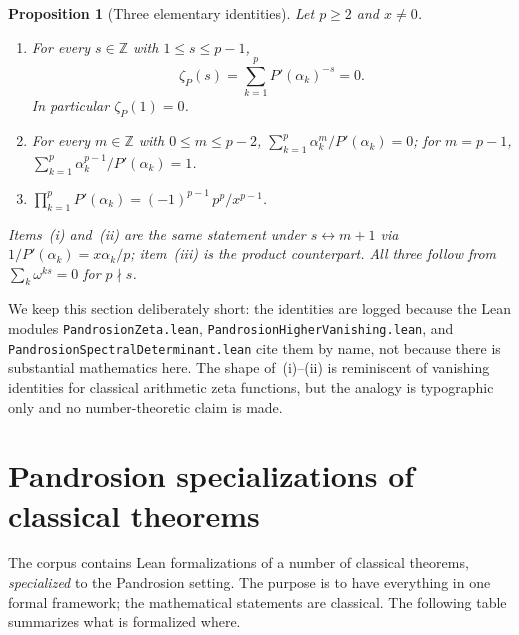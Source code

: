\documentclass[11pt,a4paper]{article}
\newtheorem{proposition}[theorem]{Proposition}
\theoremstyle{definition}
\theoremstyle{remark}
\begin{document}
\begin{proposition}[Three elementary identities]\label{thm:zeta-all}
Let $p \geq 2$ and $x \neq 0$.
\begin{enumerate}
  \item[(i)] For every $s \in \mathbb{Z}$ with $1 \leq s \leq p - 1$,
    \[
      \zeta_P(s) = \sum_{k=1}^p P'(\alpha_k)^{-s} = 0.
    \]
    In particular $\zeta_P(1) = 0$.
  \item[(ii)] For every $m \in \mathbb{Z}$ with $0 \leq m \leq p - 2$,
    $\sum_{k=1}^p \alpha_k^m / P'(\alpha_k) = 0$; for $m = p - 1$,
    $\sum_{k=1}^p \alpha_k^{p-1}/P'(\alpha_k) = 1$.
  \item[(iii)] $\prod_{k=1}^p P'(\alpha_k) = (-1)^{p-1}\,p^p/x^{p-1}$.
\end{enumerate}
Items~(i) and~(ii) are the same statement under $s \leftrightarrow m+1$
via $1/P'(\alpha_k) = x\alpha_k/p$; item~(iii) is the product
counterpart. All three follow from $\sum_k \omega^{ks} = 0$ for
$p \nmid s$.
\end{proposition}

We keep this section deliberately short: the identities are logged
because the Lean modules
\texttt{PandrosionZeta.lean},
\texttt{PandrosionHigherVanishing.lean}, and
\texttt{PandrosionSpectralDeterminant.lean} cite them by name, not
because there is substantial mathematics here. The shape of~(i)--(ii)
is reminiscent of vanishing identities for classical arithmetic zeta
functions, but the analogy is typographic only and no number-theoretic
claim is made.

\section{Pandrosion specializations of classical theorems}
\label{sec:classical}

The corpus contains Lean formalizations of a number of classical
theorems, \emph{specialized} to the Pandrosion setting. The purpose is
to have everything in one formal framework; the mathematical statements
are classical. The following table summarizes what is formalized where.
\end{document}
